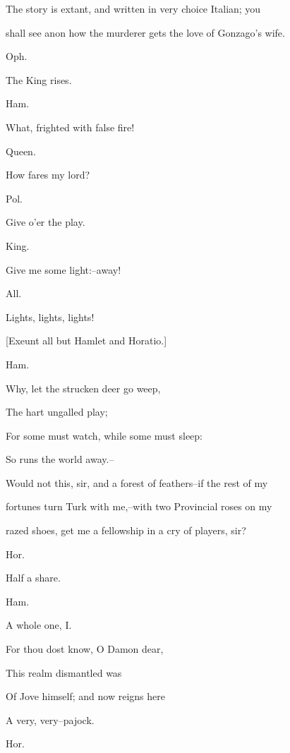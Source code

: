 \documentclass[12pt]{book}
\begin{document}
The story is extant, and written in very choice Italian; you

shall see anon how the murderer gets the love of Gonzago's wife.



Oph.

The King rises.



Ham.

What, frighted with false fire!



Queen.

How fares my lord?



Pol.

Give o'er the play.



King.

Give me some light:--away!



All.

Lights, lights, lights!



[Exeunt all but Hamlet and Horatio.]



Ham.

   Why, let the strucken deer go weep,

     The hart ungalled play;

   For some must watch, while some must sleep:

     So runs the world away.--

Would not this, sir, and a forest of feathers--if the rest of my

fortunes turn Turk with me,--with two Provincial roses on my

razed shoes, get me a fellowship in a cry of players, sir?



Hor.

Half a share.



Ham.

     A whole one, I.

   For thou dost know, O Damon dear,

     This realm dismantled was

   Of Jove himself; and now reigns here

     A very, very--pajock.



Hor.
\end{document}
